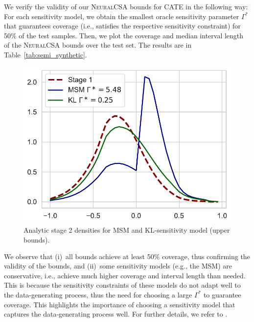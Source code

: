 \documentclass{article} %
\newcommand{\frameworkname}{\textsc{NeuralCSA}\xspace}
\theoremstyle{definition}
\theoremstyle{plain}
\begin{document}
We verify the validity of our \frameworkname bounds for CATE in the following way: For each sensitivity model, we obtain the smallest oracle sensitivity parameter $\Gamma^\ast$ that guarantees coverage (i.e., satisfies the respective sensitivity constraint) for 50\% of the test samples. Then, we plot the coverage and median interval length of the \frameworkname bounds over the test set. The results are in Table~\ref{tab:semi_synthetic}.
\begin{figure}
\vspace{-0.4cm}
 \centering
 \begin{center}
 \includegraphics[width=1\linewidth]{figures/plt_densities.pdf}
 \end{center}
 \vspace{-0.5cm}
\caption{Analytic stage 2 densities for MSM and KL-sensitivity model (upper bounds).}
\label{fig:semi_synthetic}
\vspace{-0.3cm}
\end{figure}
We observe that (i)~all bounds achieve at least 50\% coverage, thus confirming the validity of the bounds, and (ii)~some sensitivity models (e.g., the MSM) are conservative, i.e., achieve much higher coverage and interval length than needed. This is because the sensitivity constraints of these models do not adapt well to the data-generating process, thus the need for choosing a large $\Gamma^\ast$ to guarantee coverage. This highlights the importance of choosing a sensitivity model that captures the data-generating process well. For further details, we refer to \citep{Jin.2022}.
\end{document}
